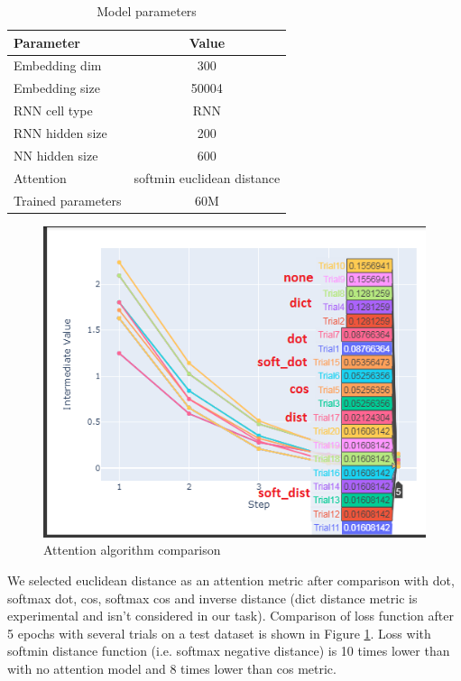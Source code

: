 \documentclass{article}
\begin{document}
\begin{table}[H] \label{tbl:rnn_model_parameters}
\begin{center}
\begin{tabular}[t]{|l|c|}
\hline
 Parameter & Value \\
\hline
Embedding dim & 300 \\
Embedding size & 50004\\
RNN cell type & RNN \\
RNN hidden size & 200 \\
NN hidden size & 600 \\
Attention & softmin euclidean distance\\
Trained parameters & 60M \\
\hline
\end{tabular}
\caption{Model parameters}
\label{tab:model_ps}
\end{center}
\end{table}


\begin{figure}[H]
    \centering
    \includegraphics[width=1.0\linewidth]{attn.png}
    \caption{Attention algorithm comparison}
    \label{fig:attn}
\end{figure}

We selected euclidean distance as an attention metric after comparison with dot, softmax dot, cos, softmax cos and inverse distance (dict distance metric is experimental and isn't considered in our task). Comparison of loss function after 5 epochs with several trials on a test dataset is shown in Figure \ref{fig:attn}. Loss with softmin distance function (i.e. softmax negative distance) is 10 times lower than with no attention model and 8 times lower than cos metric.
\end{document}
